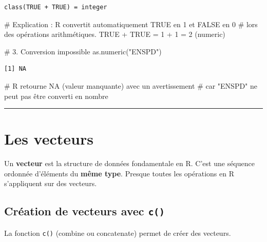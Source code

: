 \documentclass[
  french,
  11pt,
  a4paper,
]{article}
\newenvironment{Shaded}{}{}
\newcommand{\CommentTok}[1]{\textcolor[rgb]{0.42,0.45,0.49}{#1}}
\newcommand{\FunctionTok}[1]{\textcolor[rgb]{0.44,0.26,0.76}{#1}}
\newcommand{\NormalTok}[1]{\textcolor[rgb]{0.14,0.16,0.18}{#1}}
\newcommand{\StringTok}[1]{\textcolor[rgb]{0.01,0.18,0.38}{#1}}
\begin{document}
\begin{verbatim}
class(TRUE + TRUE) = integer 
\end{verbatim}

\begin{Shaded}
\begin{Highlighting}[]
\CommentTok{\# Explication : R convertit automatiquement TRUE en 1 et FALSE en 0}
\CommentTok{\# lors des opérations arithmétiques. TRUE + TRUE = 1 + 1 = 2 (numeric)}
\end{Highlighting}
\end{Shaded}

\begin{Shaded}
\begin{Highlighting}[]
\CommentTok{\# 3. Conversion impossible}
\FunctionTok{as.numeric}\NormalTok{(}\StringTok{"ENSPD"}\NormalTok{)}
\end{Highlighting}
\end{Shaded}

\begin{verbatim}
[1] NA
\end{verbatim}

\begin{Shaded}
\begin{Highlighting}[]
\CommentTok{\# R retourne NA (valeur manquante) avec un avertissement}
\CommentTok{\# car "ENSPD" ne peut pas être converti en nombre}
\end{Highlighting}
\end{Shaded}

\begin{center}\rule{0.5\linewidth}{0.5pt}\end{center}

\section{Les vecteurs}\label{les-vecteurs}

Un \textbf{vecteur} est la structure de données fondamentale en R. C'est
une séquence ordonnée d'éléments du \textbf{même type}. Presque toutes
les opérations en R s'appliquent sur des vecteurs.

\subsection{\texorpdfstring{Création de vecteurs avec
\texttt{c()}}{Création de vecteurs avec c()}}\label{cruxe9ation-de-vecteurs-avec-c}

La fonction \texttt{c()} (combine ou concatenate) permet de créer des
vecteurs.
\end{document}
